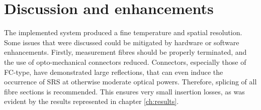 \documentclass{standalone}
\begin{document}
\chapter{Discussion and enhancements}
\setcounter{page}\thestranica


The implemented system produced a fine temperature and spatial resolution. Some issues that were discussed could be mitigated by hardware or software enhancements. Firstly, measurement fibres should be properly terminated, and the use of opto-mechanical connectors reduced. Connectors, especially those of FC-type, have demonstrated large reflections, that can even induce the occurrence of SRS at otherwise moderate optical powers. Therefore, splicing of all fibre sections is recommended. This ensures very small insertion losses, as was evident by the results represented in chapter \ref{ch:results}. \\
\end{document}
